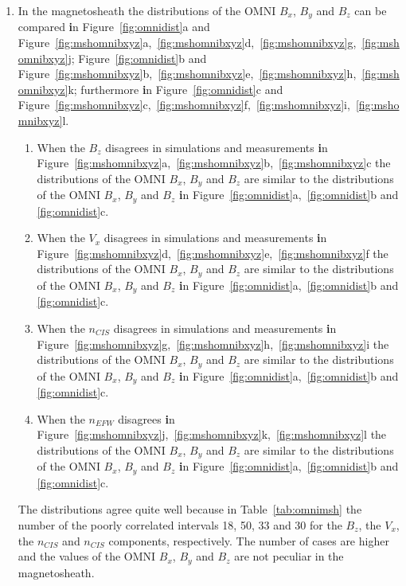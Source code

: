 \documentclass[linenumbers,draft]{agujournal}
\begin{document}
\begin{enumerate}
\item In the magnetosheath the distributions of the OMNI $B_{x}$, $B_{y}$ and $B_{z}$ can be compared \textbf{i}n Figure~\ref{fig:omnidist}a and Figure~\ref{fig:mshomnibxyz}a,~\ref{fig:mshomnibxyz}d,~\ref{fig:mshomnibxyz}g,~\ref{fig:mshomnibxyz}j; Figure~\ref{fig:omnidist}b and Figure~\ref{fig:mshomnibxyz}b,~\ref{fig:mshomnibxyz}e,~\ref{fig:mshomnibxyz}h,~\ref{fig:mshomnibxyz}k; furthermore \textbf{i}n Figure~\ref{fig:omnidist}c and Figure~\ref{fig:mshomnibxyz}c,~\ref{fig:mshomnibxyz}f,~\ref{fig:mshomnibxyz}i,~\ref{fig:mshomnibxyz}l.
\begin{enumerate}
\item When the $B_{z}$ disagrees in simulations and measurements \textbf{i}n Figure~\ref{fig:mshomnibxyz}a,~\ref{fig:mshomnibxyz}b,~\ref{fig:mshomnibxyz}c the distributions of the OMNI $B_{x}$, $B_{y}$ and $B_{z}$ are similar to the distributions of the OMNI $B_{x}$, $B_{y}$ and $B_{z}$ \textbf{i}n Figure~\ref{fig:omnidist}a,~\ref{fig:omnidist}b and \ref{fig:omnidist}c.

\item When the $V_{x}$ disagrees in simulations and measurements \textbf{i}n Figure~\ref{fig:mshomnibxyz}d,~\ref{fig:mshomnibxyz}e,~\ref{fig:mshomnibxyz}f the distributions of the OMNI $B_{x}$, $B_{y}$ and $B_{z}$ are similar to the distributions of the OMNI $B_{x}$, $B_{y}$ and $B_{z}$ \textbf{i}n Figure~\ref{fig:omnidist}a,~\ref{fig:omnidist}b and \ref{fig:omnidist}c.

\item When the $n_{CIS}$ disagrees in simulations and measurements \textbf{i}n Figure~\ref{fig:mshomnibxyz}g,~\ref{fig:mshomnibxyz}h,~\ref{fig:mshomnibxyz}i the distributions of the OMNI $B_{x}$, $B_{y}$ and $B_{z}$ are similar to the distributions of the OMNI $B_{x}$, $B_{y}$ and $B_{z}$ \textbf{i}n Figure~\ref{fig:omnidist}a,~\ref{fig:omnidist}b and \ref{fig:omnidist}c.

\item When the $n_{EFW}$ disagrees \textbf{i}n Figure~\ref{fig:mshomnibxyz}j,~\ref{fig:mshomnibxyz}k,~\ref{fig:mshomnibxyz}l the distributions of the OMNI $B_{x}$, $B_{y}$ and $B_{z}$ are similar to the distributions of the OMNI $B_{x}$, $B_{y}$ and $B_{z}$ \textbf{i}n Figure~\ref{fig:omnidist}a,~\ref{fig:omnidist}b and \ref{fig:omnidist}c.
\end{enumerate}
The distributions agree quite well because in Table~\ref{tab:omnimsh} the number of the poorly correlated intervals 18, 50, 33 and 30 for the $B_{z}$, the $V_{x}$, the $n_{CIS}$ and $n_{CIS}$ components, respectively. The number of cases are higher and the values of the OMNI $B_{x}$, $B_{y}$ and $B_{z}$ are not peculiar in the magnetosheath.


\end{enumerate}
\end{document}
